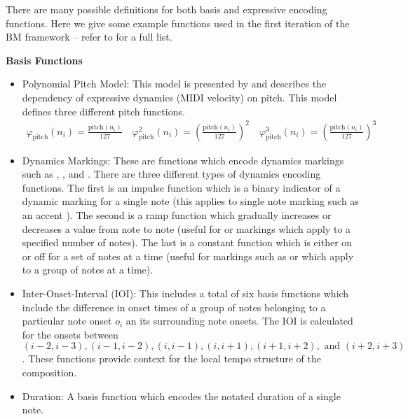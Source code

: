 There are many possible definitions for both basis and expressive encoding functions. Here we give some example functions used in the first iteration of the BM framework -- refer to \citet{eduardo2018computational} for a full list. 

\textbf{Basis Functions}

\newcommand{\pfunc}[1]{\varphi_{\textrm{pitch}}^#1(n_i)}
\newcommand{\pfuncnorm}{\varphi_{\textrm{pitch}}(n_i)}
\newcommand{\midip}{\textrm{pitch}}
\begin{itemize}
    \item Polynomial Pitch Model: This model is presented by \citet{grachten2012linear} and describes the dependency of expressive dynamics (MIDI velocity) on pitch. This model defines three different pitch functions. 
    \begin{align*}
    \pfuncnorm{} = \frac{\midip (n_i)}{127} \quad \pfunc{2} = \left(\frac{\midip(n_i)}{127}\right)^2 \quad \pfunc{3} = \left(\frac{\midip (n_i)}{127}\right)^3    
    \end{align*}
    \item Dynamics Markings: These are functions which encode dynamics markings such as , , and . There are three different types of dynamics encoding functions. The first is an impulse function  which is a binary indicator of a dynamic marking for a single note (this applies to single note marking such as an accent \wedge). The second is a ramp function which gradually increases or decreases a value from note to note (useful for  or  markings which apply to a specified number of notes). The last is a constant function which is either on or off for a set of notes at a time (useful for markings such as  or  which apply to a group of notes at a time). 
    \item Inter-Onset-Interval (IOI): This includes a total of six basis functions which include the difference in onset times of a group of notes belonging to a particular note onset $o_i$ an its surrounding note onsets. The IOI is calculated for the onsets between $(i - 2, i-3), (i-1, i-2), (i, i-1), (i, i+1), (i+1, i+2), \textrm{ and } (i+2, i+3)$. These functions provide context for the local tempo structure of the composition. 
    \item Duration: A basis function which encodes the notated duration of a single note. 
\end{itemize}

